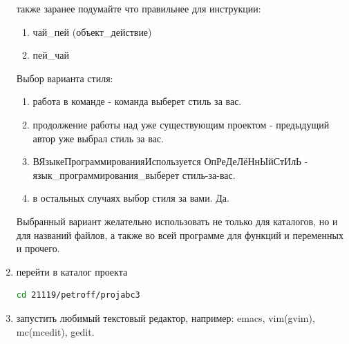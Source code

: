 \documentclass[unicode, 12pt, a4paper,oneside,fleqn]{article}
\begin{document}
\begin{enumerate}
%    
%    
%    


  

  также заранее подумайте что правильнее для инструкции:
  \begin{enumerate}
  \item чай\_пей (объект\_действие) %
  \item пей\_чай 
  \end{enumerate}



  Выбор варианта стиля:
  \begin{enumerate}
  \item работа в команде - команда выберет стиль за вас.
  \item продолжение работы над уже существующим проектом - предыдущий
    автор уже выбрал стиль за вас.
  \item ВЯзыкеПрограммированияИспользуется ОпРеДеЛёНнЫйСтИлЬ -
    язык\_программирования\_выберет стиль-за-вас.
  \item в остальных случаях выбор стиля за вами. Да.
  \end{enumerate}
  
  Выбранный вариант желательно использовать не только для каталогов,
  но и для названий файлов, а также во всей программе для функций и
  переменных и прочего.


\item перейти в каталог проекта
\begin{lstlisting}[language=bash]
cd 21119/petroff/projabc3
\end{lstlisting}

\item запустить любимый текстовый редактор, например: emacs,
  vim(gvim), mc(mcedit), gedit.


\end{enumerate}
\end{document}
